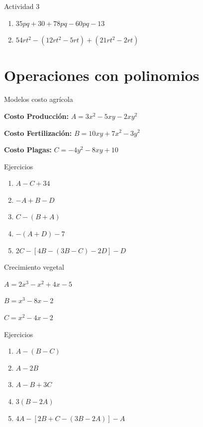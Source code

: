 \documentclass[handout,aspectratio=169,11pt]{beamer}
\begin{document}
	\begin{frame}{Actividad 3}
		\small
		\begin{enumerate}
			\item $35pq + 30 + 78pq - 60pq - 13$
			\item $54rt^2 - (12rt^2 - 5rt) + (21rt^2 - 2rt)$
		\end{enumerate}
	\end{frame}
	
	\section{Operaciones con polinomios}
	
	\begin{frame}{Modelos costo agrícola}
		\small
		
		\textbf{Costo Producción:} $A = 3x^2 - 5xy - 2xy^2$
		
		\textbf{Costo Fertilización:} $B = 10xy + 7x^2 - 3y^2$
		
		\textbf{Costo Plagas:} $C = -4y^2 - 8xy + 10$
		
	\end{frame}
	
	\begin{frame}{Ejercicios}
		\small
		\begin{enumerate}
			\item $A - C + 34$
			\item $-A + B - D$
			\item $C - (B + A)$
			\item $-(A + D) - 7$
			\item $2C - [4B - (3B - C) - 2D] - D$
		\end{enumerate}
	\end{frame}
	
	\begin{frame}{Crecimiento vegetal}
		\small
		
		$A = 2x^3 - x^2 + 4x - 5$
		
		$B = x^3 - 8x - 2$
		
		$C = x^2 - 4x - 2$
		
	\end{frame}
	
	\begin{frame}{Ejercicios}
		\small
		\begin{enumerate}
			\item $A - (B - C)$
			\item $A - 2B$
			\item $A - B + 3C$
			\item $3(B - 2A)$
			\item $4A - [2B + C - (3B - 2A)] - A$
		\end{enumerate}
	\end{frame}
	
\end{document}
